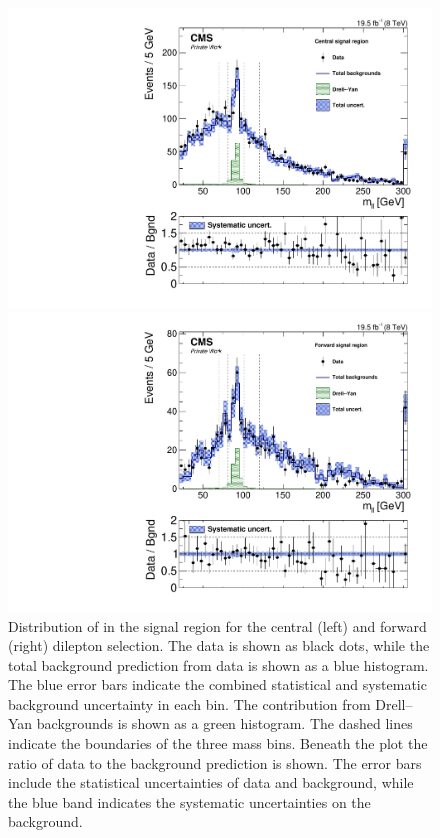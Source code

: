\begin{figure}[htbp]
\centering
\begin{minipage}[t]{0.49\textwidth}
  \includegraphics[width=\textwidth]{plots/results/mllResult_SignalCentral_Full2012_SF.pdf}
\end{minipage}
\begin{minipage}[t]{0.49\textwidth}
\includegraphics[width=\textwidth]{plots/results/mllResult_SignalForward_Full2012_SF.pdf}
\end{minipage}

\caption{Distribution of \mll in the signal region for the central (left) and forward (right) dilepton selection. The data is shown as black dots, while the total background prediction from data is shown as a blue histogram. The blue error bars indicate the combined statistical and systematic background uncertainty in each bin. The contribution from Drell--Yan backgrounds is shown as a green histogram. The dashed lines indicate the boundaries of the three mass bins. Beneath the plot the ratio of data to the background prediction is shown. The error bars include the statistical uncertainties of data and background, while the blue band indicates the systematic uncertainties on the background. }
\label{fig:resultsCC}
\end{figure} 

